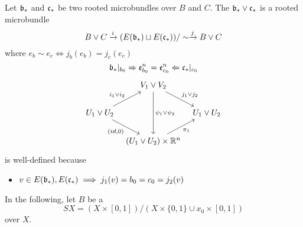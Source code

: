 \begin{mydefinition}
    Let $\bb_*$ and $\bc_*$ be two rooted microbundles over $B$ and $C$.
    The  $\bb_* \vee \bc_*$ is a rooted microbundle
    \[ \bundle{B \vee C}{(E(\bb_*) \sqcup E(\bc_*)) / \sim}{i}{j} \]
    where $e_b \sim e_c \iff j_b(e_b) = j_c(e_c)$
    \[ \bb_*\restr{b_0} \double \be^n_{b_0} = \be^n_{c_0} \Leftarrow \bc_*\restr{c_0} \]
    \[
        \begin{tikzcd}[column sep=tiny]
            & V_1 \vee V_2 \ar[dr, "j_1 \vee j_2"] \ar[dd, "\psi_1 \vee \psi_2"] & \\
            U_1 \vee U_2 \ar[ur, "i_1 \vee i_2"] \ar[dr, "{(id, 0)}"'] & & U_1 \vee U_2 \\
            & (U_1 \vee U_2) \times\R^n \ar[ur, "\pi_1"'] &
        \end{tikzcd}
    \]
    is well-defined because
    \begin{itemize}
        \item $v \in E(\bb_*), E(\bc_*) \implies j_1(v)  = b_0 = c_0 = j_2(v)$
    \end{itemize}
\end{mydefinition}

\begin{myparagraph}
    In the following, let $B$ be a 
    \[ SX = (X \times [0, 1]) / (X \times \{ 0, 1 \} \cup x_0 \times [0, 1])\]
    over $X$.
\end{myparagraph}

\begin{mylemma}\label{suspension::lemma1}
    
\end{mylemma}